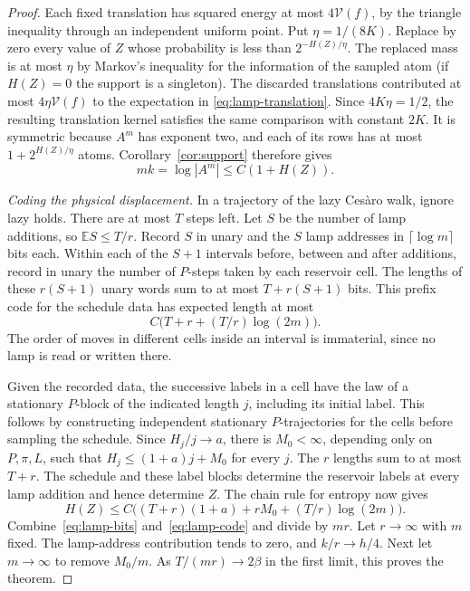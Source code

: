 \begin{proof}
Each fixed translation has squared energy at most $4\mathcal V(f)$,
by the triangle inequality through an independent uniform point.
Put $\eta=1/(8K)$. Replace by zero every value of $Z$ whose probability
is less than $2^{-H(Z)/\eta}$. The replaced mass is at most $\eta$
by Markov's inequality for the information of the sampled atom (if
$H(Z)=0$ the support is a singleton). The discarded translations
contributed at most
\(4\eta\mathcal V(f)\) to the expectation in
\eqref{eq:lamp-translation}. Since \(4K\eta=1/2\), the resulting
translation kernel satisfies the same comparison with constant \(2K\).
It is symmetric because $A^m$ has exponent two, and each of its rows
has at most $1+2^{H(Z)/\eta}$ atoms. Corollary~\ref{cor:support}
therefore gives
\begin{equation}\label{eq:lamp-bits}
 mk=\log |A^m|\le C(1+H(Z)).
\end{equation}

\smallskip\noindent
\emph{Coding the physical displacement.}
In a trajectory of the lazy Ces\`aro walk, ignore lazy holds. There
are at most $T$ steps left. Let $S$ be the number of lamp additions,
so $\mathbb E S\le T/r$. Record $S$ in unary and the $S$ lamp
addresses in $\lceil\log m\rceil$ bits each. Within each of the $S+1$
intervals before, between and after additions, record in unary the
number of $P$-steps taken by each reservoir cell. The lengths of
these $r(S+1)$ unary words sum to at most $T+r(S+1)$ bits.
This prefix code for the schedule data has expected length at most
\[
 C\big(T+r+(T/r)\log(2m)\big).
\]
The order of moves in different cells inside an interval is
immaterial, since no lamp is read or written there.

Given the recorded data, the successive labels in a cell have the law
of a stationary $P$-block of the indicated length $j$, including its
initial label. This follows by constructing independent stationary
$P$-trajectories for the cells before sampling the schedule. Since
$H_j/j\to a$, there is $M_0<\infty$, depending only on $P,\pi,L$,
such that $H_j\le (1+a)j+M_0$ for every $j$. The $r$ lengths sum to
at most $T+r$. The schedule and these label blocks determine the
reservoir labels at every lamp addition and hence determine $Z$.
The chain rule for entropy now gives
\begin{equation}\label{eq:lamp-code}
 H(Z)\le C\big((T+r)(1+a)+rM_0+(T/r)\log(2m)\big).
\end{equation}
Combine~\eqref{eq:lamp-bits} and~\eqref{eq:lamp-code} and divide by
$mr$. Let $r\to\infty$ with $m$ fixed. The lamp-address contribution
tends to zero, and $k/r\to h/4$. Next let $m\to\infty$ to remove
$M_0/m$. As $T/(mr)\to 2\beta$ in the first limit, this proves the
theorem.
\end{proof}

